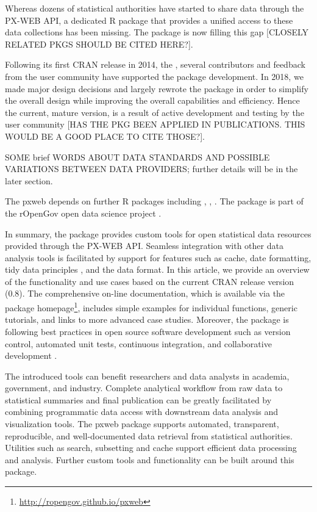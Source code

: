 \documentclass[article]{jss}
\begin{document}
Whereas dozens of statistical authorities have started to share data through the PX-WEB API, 
a dedicated R package that provides a unified access to these data collections has been missing. The  package is now filling this gap [CLOSELY RELATED PKGS SHOULD BE CITED HERE?]. 

Following its first CRAN release in 2014, the , several contributors and feedback from the user community have supported the package development. In 2018, we made major design decisions and largely rewrote the package in order to simplify the overall design while improving the overall capabilities and efficiency. Hence the current, mature version, is a result of active development and testing by the user community [HAS THE PKG BEEN APPLIED IN PUBLICATIONS. THIS WOULD BE A GOOD PLACE TO CITE THOSE?]. 

SOME brief WORDS ABOUT DATA STANDARDS AND POSSIBLE VARIATIONS BETWEEN DATA PROVIDERS; further details will be in the later section.

The pxweb depends on further R packages including  \citep{checkmate},  \citep{httr},  \citep{jsonlite}. The  package is part of the rOpenGov open data science project \citep{Lahti13icml}.


In summary, the  package provides custom tools for open statistical data resources provided through the PX-WEB API. Seamless integration with other data analysis tools is facilitated by support for features such as cache, date formatting, tidy data principles \citep{wickham2014}, and the  \citep{tibble} data format. In this article, we provide an overview of the functionality and use cases based on the current CRAN release version (0.8). The comprehensive on-line documentation, which is available via the package homepage\footnote{\url{http://ropengov.github.io/pxweb}}, includes simple examples for individual functions, generic tutorials, and links to more advanced case studies. Moreover, the package is following best practices in open source software development such as version control, automated unit tests, continuous integration, and collaborative development \citep{PerezRiverol2016}.

The introduced tools can benefit researchers and data analysts in academia, government, and industry. Complete analytical workflow from raw data to statistical summaries and final publication can be greatly facilitated by combining programmatic data access with downstream data analysis and visualization tools. The pxweb package supports automated, transparent, reproducible, and well-documented data retrieval from statistical authorities. Utilities such as search, subsetting and cache support efficient data processing and analysis. Further custom tools and functionality can be built around this package. 
\end{document}
